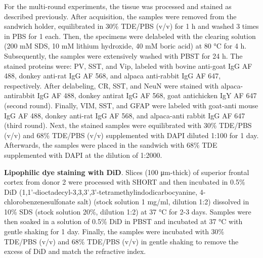 \documentclass{article}
\begin{document}
For the multi-round experiments, the tissue was processed and stained as described previously. After acquisition, the samples were removed from the sandwich holder, equilibrated in 30\% TDE/PBS (v/v) for 1 h and washed 3 times in PBS for 1 each. Then, the specimens were delabeled with the clearing solution (200 mM SDS, 10 mM lithium hydroxide, 40 mM boric acid) at 80 °C for 4 h. Subsequently, the samples were extensively washed with PBST for 24 h. The stained proteins were: PV, SST, and Vip, labeled with bovine anti-goat IgG AF 488, donkey anti-rat IgG AF 568, and alpaca anti-rabbit IgG AF 647, respectively. After delabeling, CR, SST, and NeuN were stained with alpaca-antirabbit IgG AF 488, donkey antirat IgG AF 568, goat antichicken IgY AF 647 (second round). Finally, VIM, SST, and GFAP were labeled with goat-anti mouse IgG AF 488, donkey anti-rat IgG AF 568, and alpaca-anti rabbit IgG AF 647 (third round). Next, the stained samples were equilibrated with 30\% TDE/PBS (v/v) and 68\% TDE/PBS (v/v) supplemented with DAPI diluted 1:100 for 1 day. Afterwards, the samples were placed in the sandwich with 68\% TDE supplemented with DAPI at the dilution of 1:2000.

\textbf{Lipophilic dye staining with DiD}. Slices (100 μm-thick) of superior frontal cortex from donor 2 were processed with SHORT and then incubated in 0.5\% DiD (1,1’-dioctadecyl-3,3,3’,3’-tetramethylindodicarbocyanine, 4-chlorobenzenesulfonate salt) (stock solution 1 mg/ml, dilution 1:2) dissolved in 10\% SDS (stock solution 20\%, dilution 1:2) at 37 °C for 2-3 days. Samples were then soaked in a solution of 0.5\% DiD in PBST and incubated at 37 °C with gentle shaking for 1 day. Finally, the samples were incubated with 30\% TDE/PBS (v/v) and 68\% TDE/PBS (v/v) in gentle shaking to remove the excess of DiD and match the refractive index.
\end{document}
